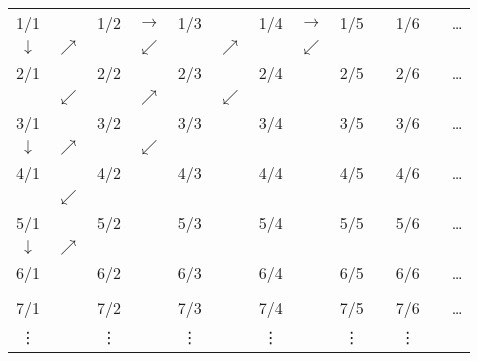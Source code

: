 

\newcommand{\f}[2]{\small{#1/#2}} 

\newcommand{\ra}{\ensuremath{\rightarrow}} 

\newcommand{\da}{\ensuremath{\downarrow}} 

\newcommand{\nea}{\ensuremath{\nearrow}} 

\newcommand{\swa}{\ensuremath{\swarrow}}
\renewcommand{\arraystretch}{1}
\renewcommand{\tabcolsep}{3pt}

\begin{tabular}{ccccccccccccc}

 \rowcolor{lgray}
 \f{1}{1}	& 		&\f{1}{2}	&\ra  	&\f{1}{3}	& 		&\f{1}{4}	& \ra 	&\f{1}{5}	& 		&\f{1}{6} 	& 	&\ldots\\[0pt]

 \da		&\nea 	&        	&\swa &        		&\nea 	&        	&\swa 	&        	&	 	&        	& 	&	      \\[0pt]

 \rowcolor{lgray}
 \f{2}{1}& &\f{2}{2}& &\f{2}{3}& &\f{2}{4}& &\f{2}{5}& &\f{2}{6}& &\ldots\\[0pt]

		 &  \swa      & & \nea       & & \swa       & &        & &        & &      \\[0pt]

 
\rowcolor{lgray}
 \f{3}{1}& &\f{3}{2}& &\f{3}{3}& &\f{3}{4}& &\f{3}{5}& &\f{3}{6}& &\ldots\\[0pt]


 \da		&\nea &        &\swa &        & &        & &        & &        & &      
 \\[0pt]

 \rowcolor{lgray}
 \f{4}{1}& &\f{4}{2}& &\f{4}{3}& &\f{4}{4}& &\f{4}{5}& &\f{4}{6}& &\ldots\\[0pt]

				& \swa&        & &        & &        & &        & &        & &      \\[0pt]
 
 \rowcolor{lgray}
 \f{5}{1}& &\f{5}{2}& &\f{5}{3}& &\f{5}{4}& &\f{5}{5}& &\f{5}{6}& &\ldots\\[0pt]

				\da	& \nea &        & &        & &        & &        & &        
					& &      \\[0pt]

					
 \rowcolor{lgray}
 \f{6}{1}& &\f{6}{2}& &\f{6}{3}& &\f{6}{4}& &\f{6}{5}& &\f{6}{6}& &\ldots\\[0pt]

		 &        & &        & &        & &        & &        & &      \\[0pt]
 
 \rowcolor{lgray}
 \f{7}{1}& &\f{7}{2}& &\f{7}{3}& &\f{7}{4}& &\f{7}{5}& &\f{7}{6}	& &\ldots\\[0pt]

 
 \vdots &&\vdots  &&\vdots  &&\vdots  &&\vdots  &&\vdots  &&\\


\end{tabular}


